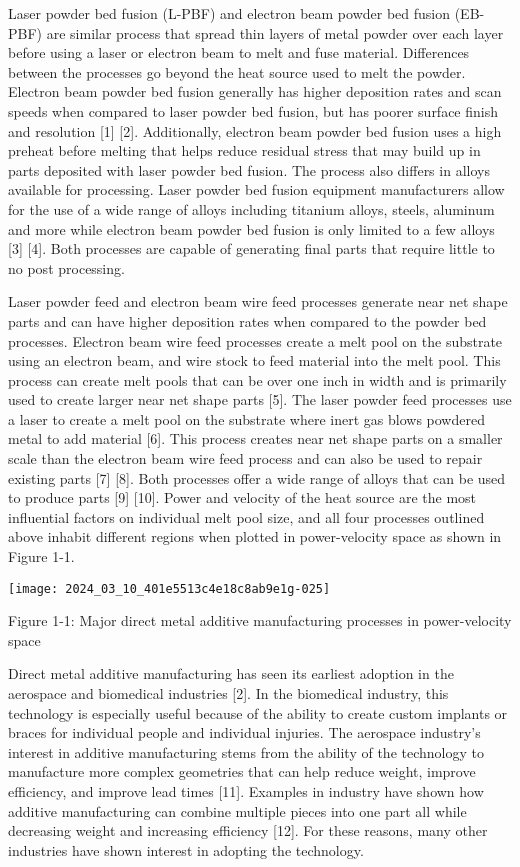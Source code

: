\documentclass[10pt]{article}
\begin{document}
Laser powder bed fusion (L-PBF) and electron beam powder bed fusion (EB-PBF) are similar process that spread thin layers of metal powder over each layer before using a laser or electron beam to melt and fuse material. Differences between the processes go beyond the heat source used to melt the powder. Electron beam powder bed fusion generally has higher deposition rates and scan speeds when compared to laser powder bed fusion, but has poorer surface finish and resolution [1] [2]. Additionally, electron beam powder bed fusion uses a high preheat before melting that helps reduce residual stress that may build up in parts deposited with laser powder bed fusion. The process also differs in alloys available for processing. Laser powder bed fusion equipment manufacturers allow for the use of a wide range of alloys including titanium alloys, steels, aluminum and more while electron beam powder bed fusion is only limited to a few alloys [3] [4]. Both processes are capable of generating final parts that require little to no post processing.

Laser powder feed and electron beam wire feed processes generate near net shape parts and can have higher deposition rates when compared to the powder bed processes. Electron beam wire feed processes create a melt pool on the substrate using an electron beam, and wire stock to feed material into the melt pool. This process can create melt pools that can be over one inch in width and is primarily used to create larger near net shape parts [5]. The laser powder feed processes use a laser to create a melt pool on the substrate where inert gas blows powdered metal to add material [6]. This process creates near net shape parts on a smaller scale than the electron beam wire feed process and can also be used to repair existing parts [7] [8]. Both processes offer a wide range of alloys that can be used to produce parts [9] [10]. Power and velocity of the heat source are the most influential factors on individual melt pool size, and all four processes outlined above inhabit different regions when plotted in power-velocity space as shown in Figure 1-1.

\begin{center}
\texttt{[image: 2024\_03\_10\_401e5513c4e18c8ab9e1g-025]}
\end{center}

Figure 1-1: Major direct metal additive manufacturing processes in power-velocity space

Direct metal additive manufacturing has seen its earliest adoption in the aerospace and biomedical industries [2]. In the biomedical industry, this technology is especially useful because of the ability to create custom implants or braces for individual people and individual injuries. The aerospace industry's interest in additive manufacturing stems from the ability of the technology to manufacture more complex geometries that can help reduce weight, improve efficiency, and improve lead times [11]. Examples in industry have shown how additive manufacturing can combine multiple pieces into one part all while decreasing weight and increasing efficiency [12]. For these reasons, many other industries have shown interest in adopting the technology.
\end{document}
